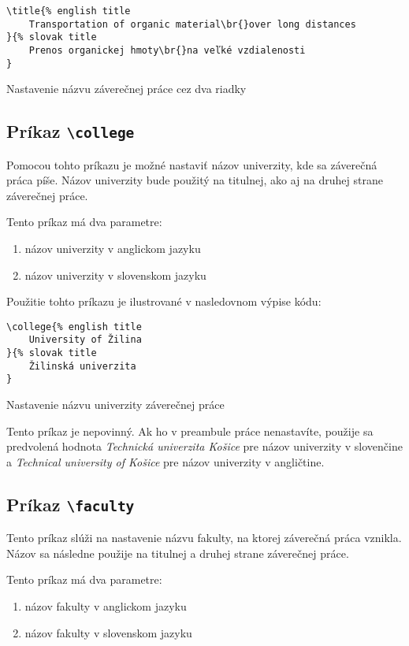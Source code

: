 \begin{listing}[ht]
\begin{verbatim}
\title{% english title
    Transportation of organic material\br{}over long distances
}{% slovak title
    Prenos organickej hmoty\br{}na veľké vzdialenosti
}
\end{verbatim}
\caption{Nastavenie názvu záverečnej práce cez dva riadky}
\end{listing}


\subsection{Príkaz {\tt \textbackslash{}college}}

Pomocou tohto príkazu je možné nastaviť názov univerzity, kde sa záverečná práca píše. Názov univerzity bude použitý na titulnej, ako aj na druhej strane záverečnej práce.

Tento príkaz má dva parametre:
\begin{enumerate}
    \item názov univerzity v anglickom jazyku
    \item názov univerzity v slovenskom jazyku
\end{enumerate}

Použitie tohto príkazu je ilustrované v nasledovnom výpise kódu:

\begin{listing}[ht]
\begin{verbatim}
\college{% english title
    University of Žilina
}{% slovak title
    Žilinská univerzita
}
\end{verbatim}
\caption{Nastavenie názvu univerzity záverečnej práce}
\end{listing}

Tento príkaz je nepovinný. Ak ho v preambule práce nenastavíte, použije sa predvolená hodnota {\it Technická univerzita Košice} pre názov univerzity v slovenčine a {\it Technical university of Košice} pre názov univerzity v angličtine.


\subsection{Príkaz {\tt \textbackslash{}faculty}}

Tento príkaz slúži na nastavenie názvu fakulty, na ktorej záverečná práca vznikla. Názov sa následne použije na titulnej a druhej strane záverečnej práce.

Tento príkaz má dva parametre:
\begin{enumerate}
    \item názov fakulty v anglickom jazyku
    \item názov fakulty v slovenskom jazyku
\end{enumerate}

